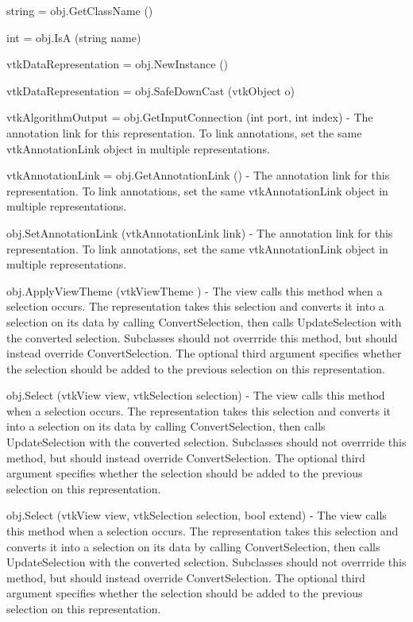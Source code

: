 \begin{DoxyItemize}
\item {\ttfamily string = obj.\-Get\-Class\-Name ()}  
\item {\ttfamily int = obj.\-Is\-A (string name)}  
\item {\ttfamily vtk\-Data\-Representation = obj.\-New\-Instance ()}  
\item {\ttfamily vtk\-Data\-Representation = obj.\-Safe\-Down\-Cast (vtk\-Object o)}  
\item {\ttfamily vtk\-Algorithm\-Output = obj.\-Get\-Input\-Connection (int port, int index)} -\/ The annotation link for this representation. To link annotations, set the same vtk\-Annotation\-Link object in multiple representations.  
\item {\ttfamily vtk\-Annotation\-Link = obj.\-Get\-Annotation\-Link ()} -\/ The annotation link for this representation. To link annotations, set the same vtk\-Annotation\-Link object in multiple representations.  
\item {\ttfamily obj.\-Set\-Annotation\-Link (vtk\-Annotation\-Link link)} -\/ The annotation link for this representation. To link annotations, set the same vtk\-Annotation\-Link object in multiple representations.  
\item {\ttfamily obj.\-Apply\-View\-Theme (vtk\-View\-Theme )} -\/ The view calls this method when a selection occurs. The representation takes this selection and converts it into a selection on its data by calling Convert\-Selection, then calls Update\-Selection with the converted selection. Subclasses should not overrride this method, but should instead override Convert\-Selection. The optional third argument specifies whether the selection should be added to the previous selection on this representation.  
\item {\ttfamily obj.\-Select (vtk\-View view, vtk\-Selection selection)} -\/ The view calls this method when a selection occurs. The representation takes this selection and converts it into a selection on its data by calling Convert\-Selection, then calls Update\-Selection with the converted selection. Subclasses should not overrride this method, but should instead override Convert\-Selection. The optional third argument specifies whether the selection should be added to the previous selection on this representation.  
\item {\ttfamily obj.\-Select (vtk\-View view, vtk\-Selection selection, bool extend)} -\/ The view calls this method when a selection occurs. The representation takes this selection and converts it into a selection on its data by calling Convert\-Selection, then calls Update\-Selection with the converted selection. Subclasses should not overrride this method, but should instead override Convert\-Selection. The optional third argument specifies whether the selection should be added to the previous selection on this representation.  

\end{DoxyItemize}
